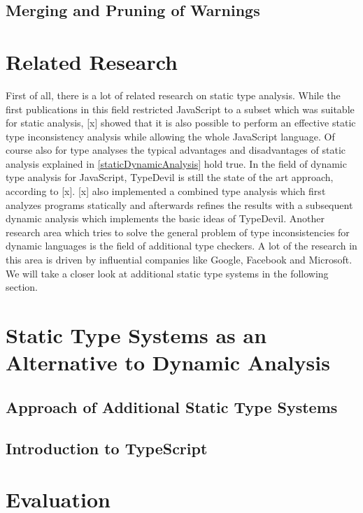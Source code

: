 \documentclass[runningheads,a4paper]{llncs}
\begin{document}
\subsection{Merging and Pruning of Warnings}


\section{Related Research}

First of all, there is a lot of related research on static type analysis.
While the first publications in this field restricted JavaScript to a subset which was suitable for static analysis, [x] showed that it is also possible to perform an effective static type inconsistency analysis while allowing the whole JavaScript language.
Of course also for type analyses the typical advantages and disadvantages of static analysis explained in \ref{staticDynamicAnalysis} hold true.
In the field of dynamic type analysis for JavaScript, TypeDevil is still the state of the art approach, according to [x]. 
[x] also implemented a combined type analysis which first analyzes programs statically and afterwards refines the results with a subsequent dynamic analysis which implements the basic ideas of TypeDevil.
Another research area which tries to solve the general problem of type inconsistencies for dynamic languages is the field of additional type checkers.
A lot of the research in this area is driven by influential companies like Google, Facebook and Microsoft.
We will take a closer look at additional static type systems in the following section.


\section{Static Type Systems as an Alternative to Dynamic Analysis}

\subsection{Approach of Additional Static Type Systems}

\subsection{Introduction to TypeScript}


\section{Evaluation}
\end{document}
